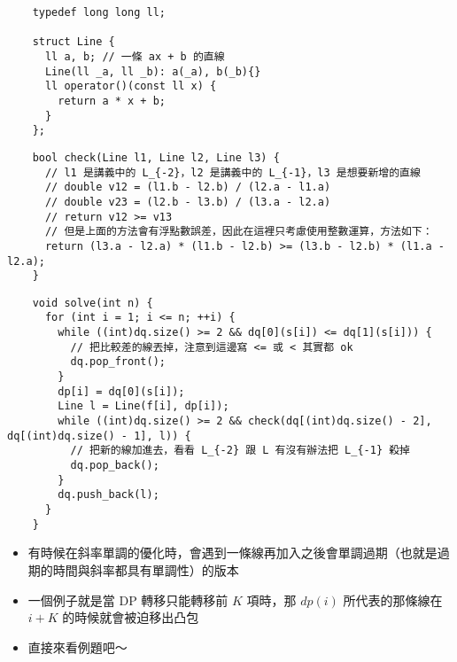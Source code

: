 \documentclass[standalone]{beamer}
\begin{document}
\begin{frame}[fragile]{}
  \begin{verbatim}
    typedef long long ll;

    struct Line {
      ll a, b; // 一條 ax + b 的直線
      Line(ll _a, ll _b): a(_a), b(_b){}
      ll operator()(const ll x) {
        return a * x + b;
      }
    };
  \end{verbatim}
\end{frame}

\begin{frame}[fragile]{}
  \begin{verbatim}
    bool check(Line l1, Line l2, Line l3) {
      // l1 是講義中的 L_{-2}，l2 是講義中的 L_{-1}，l3 是想要新增的直線
      // double v12 = (l1.b - l2.b) / (l2.a - l1.a) 
      // double v23 = (l2.b - l3.b) / (l3.a - l2.a)
      // return v12 >= v13
      // 但是上面的方法會有浮點數誤差，因此在這裡只考慮使用整數運算，方法如下：
      return (l3.a - l2.a) * (l1.b - l2.b) >= (l3.b - l2.b) * (l1.a - l2.a);
    }
  \end{verbatim}
\end{frame}

\begin{frame}[fragile]{}
  \begin{verbatim}
    void solve(int n) {
      for (int i = 1; i <= n; ++i) {
        while ((int)dq.size() >= 2 && dq[0](s[i]) <= dq[1](s[i])) {
          // 把比較差的線丟掉，注意到這邊寫 <= 或 < 其實都 ok
          dq.pop_front();
        }
        dp[i] = dq[0](s[i]);
        Line l = Line(f[i], dp[i]);
        while ((int)dq.size() >= 2 && check(dq[(int)dq.size() - 2], dq[(int)dq.size() - 1], l)) {
          // 把新的線加進去，看看 L_{-2} 跟 L 有沒有辦法把 L_{-1} 殺掉
          dq.pop_back();
        }
        dq.push_back(l);
      }
    }
  \end{verbatim}
\end{frame}

\begin{frame}{}
  \begin{itemize}
    \item 有時候在斜率單調的優化時，會遇到一條線再加入之後會單調過期（也就是過期的時間與斜率都具有單調性）的版本
    \item 一個例子就是當 DP 轉移只能轉移前 $K$ 項時，那 $dp(i)$ 所代表的那條線在 $i + K$ 的時候就會被迫移出凸包
    \item 直接來看例題吧～
  \end{itemize}
\end{frame}
\end{document}

